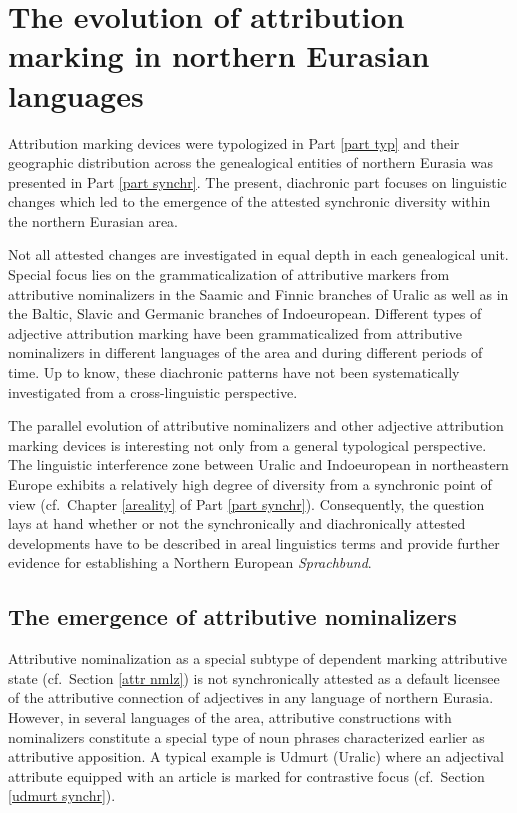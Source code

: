 
\chapter[The evolution of attribution marking]{The evolution of attribution marking in northern Eurasian languages}
Attribution marking devices were typologized in Part \ref{part typ} and their geographic distribution across the genealogical entities of northern Eurasia was presented in Part \ref{part synchr}. The present, diachronic part focuses on linguistic changes which led to the emergence of the attested synchronic diversity within the northern Eurasian area.

Not all attested changes are investigated in equal depth in each genealogical unit. Special focus lies on the grammaticalization of attributive markers from attributive nominalizers in the Saamic and Finnic branches of Uralic as well as in the Baltic, Slavic and Germanic branches of Indoeuropean. Different types of adjective attribution marking have been grammaticalized from attributive nominalizers in different languages of the area and during different periods of time. Up to know, these diachronic patterns have not been systematically investigated from a cross-linguistic perspective.

The parallel evolution of attributive nominalizers and other adjective attribution marking devices is interesting not only from a general typological perspective. The linguistic interference zone between Uralic and Indoeuropean in northeastern Europe exhibits a relatively high degree of diversity from a synchronic point of view (cf.~Chapter \ref{areality} of Part \ref{part synchr}). Consequently, the question lays at hand whether or not the synchronically and diachronically attested developments have to be described in areal linguistics terms and provide further evidence for establishing a Northern European \textit{Sprachbund}.

\section[Attributive nominalizers]{The emergence of attributive nominalizers}
Attributive nominalization as a special subtype of dependent marking attributive state (cf.~Section \ref{attr nmlz}) is not synchronically attested as a default licensee of the attributive connection of adjectives in any language of northern Eurasia. However, in several languages of the area, attributive constructions with nominalizers constitute a special type of noun phrases characterized earlier as attributive apposition. A typical example is Udmurt (Uralic) where an adjectival attribute equipped with an article is marked for contrastive focus (cf.~Section \ref{udmurt synchr}).

